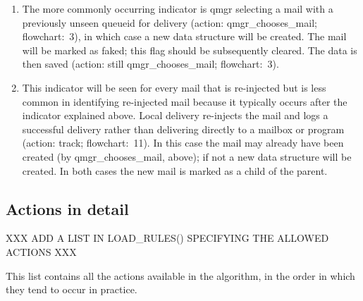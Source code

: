 \documentclass[a4paper,12pt,draft]{article}
\begin{document}
\begin{enumerate}

    \item The more commonly occurring indicator is qmgr selecting a mail
        with a previously unseen queueid for delivery (action:
        qmgr\_chooses\_mail; flowchart:~3), in which case a new data
        structure will be created.  The mail will be marked as faked; this
        flag should be subsequently cleared.  The data is then saved
        (action: still qmgr\_chooses\_mail; flowchart:~3).  

    \item This indicator will be seen for every mail that is re-injected
        but is less common in identifying re-injected mail because it
        typically occurs after the indicator explained above.  Local
        delivery re-injects the mail and logs a successful delivery rather
        than delivering directly to a mailbox or program (action: track;
        flowchart:~11).  In this case the mail may already have been
        created (by qmgr\_chooses\_mail, above); if not a new data
        structure will be created.  In both cases the new mail is marked as
        a child of the parent.

\end{enumerate}


\subsection{Actions in detail}

\label{actions-in-detail}

XXX ADD A LIST IN LOAD\_RULES() SPECIFYING THE ALLOWED ACTIONS XXX

This list contains all the actions available in the algorithm, in the order
in which they tend to occur in practice.
\end{document}
